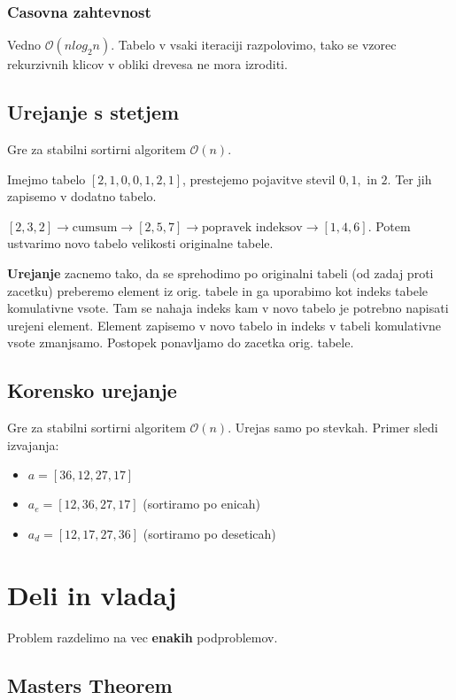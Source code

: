 \documentclass{article}
\begin{document}
\begin{multicols}{4}
\subsubsection{Casovna zahtevnost}
Vedno $\mathcal{O}(nlog_2n)$. Tabelo v vsaki iteraciji razpolovimo, tako se vzorec rekurzivnih klicov v obliki drevesa ne mora izroditi.

\subsection{Urejanje s stetjem}
Gre za stabilni sortirni algoritem $\mathcal{O}(n)$.

Imejmo tabelo $[2, 1, 0, 0, 1,  2, 1]$, prestejemo pojavitve stevil $0, 1, \text{ in } 2$. Ter jih zapisemo v dodatno tabelo.

$[2, 3, 2] \rightarrow \text{cumsum} \rightarrow [2, 5 , 7] \rightarrow  \text{popravek indeksov} \rightarrow [1, 4, 6]$.
Potem ustvarimo novo tabelo velikosti originalne tabele.

\textbf{Urejanje} zacnemo tako, da se sprehodimo po originalni tabeli (od zadaj proti zacetku) preberemo element iz orig. tabele in ga uporabimo kot indeks tabele komulativne vsote. Tam se nahaja indeks kam v novo tabelo je potrebno napisati urejeni element. Element zapisemo v novo tabelo in indeks v tabeli komulativne vsote zmanjsamo. Postopek ponavljamo do zacetka orig. tabele.

\subsection{Korensko urejanje}
Gre za stabilni sortirni algoritem $\mathcal{O}(n)$.
Urejas samo po stevkah.
Primer sledi izvajanja:
\begin{itemize}
    \item $a = [36, 12, 27, 17]$
    \item $a_e = [12, 36, 27, 17]$ (sortiramo po enicah)
    \item $a_d = [12, 17, 27, 36]$ (sortiramo po deseticah)
\end{itemize}

\section{Deli in vladaj}
Problem razdelimo na vec \textbf{enakih} podproblemov. 

\subsection{Masters Theorem}


\end{multicols}
\end{document}
